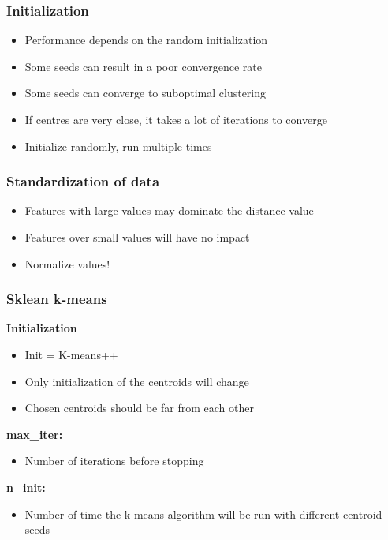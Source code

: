 \subsubsection{Initialization}
\begin{itemize}
    \item Performance depends on the random initialization
    \item Some seeds can result in a poor convergence rate
    \item Some seeds can converge to suboptimal clustering
    \item If centres are very close, it takes a lot of iterations to converge
    \item Initialize randomly, run multiple times
\end{itemize}

\subsubsection{Standardization of data}
\begin{itemize}
    \item Features with large values may dominate the distance value
    \item Features over small values will have no impact
    \item Normalize values!
\end{itemize}

\subsubsection{Sklean k-means}
\textbf{Initialization}
\begin{itemize}
    \item Init = K-means++
    \item Only initialization of the centroids will change
    \item Chosen centroids should be far from each other
\end{itemize}
\textbf{max\_iter:}
\begin{itemize}
    \item Number of iterations before stopping
\end{itemize}
\textbf{n\_init:}
\begin{itemize}
    \item Number of time the k-means algorithm will be run with different centroid seeds
\end{itemize}


